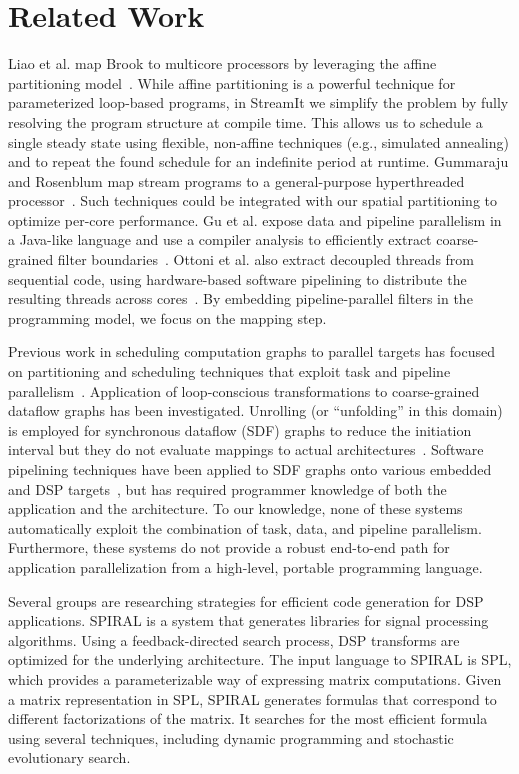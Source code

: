\section{Related Work}


Liao et al. map Brook to multicore processors by leveraging the affine
partitioning model~\cite{liao06brook}.  While affine partitioning is a
powerful technique for parameterized loop-based programs, in StreamIt we
simplify the problem by fully resolving the program structure at
compile time.  This allows us to schedule a single steady state using
flexible, non-affine techniques (e.g., simulated annealing) and to
repeat the found schedule for an indefinite period at runtime.
Gummaraju and Rosenblum map stream programs to a general-purpose
hyperthreaded processor~\cite{gummaraju05micro}.  Such techniques
could be integrated with our spatial partitioning to optimize per-core
performance.  Gu et al. expose data and pipeline parallelism in a
Java-like language and use a compiler analysis to efficiently extract
coarse-grained filter boundaries~\cite{du03sc}.  Ottoni et al. also
extract decoupled threads from sequential code, using hardware-based
software pipelining to distribute the resulting threads across
cores~\cite{ottoni05decoupled}.  By embedding pipeline-parallel
filters in the programming model, we focus on the mapping step.

Previous work in scheduling computation graphs to parallel targets has
focused on partitioning and scheduling techniques that exploit task
and pipeline parallelism~\cite{SDFSched, SDFSched2,may87communicating,
DAGSched, pipeline-sdf}.  Application of loop-conscious
transformations to coarse-grained dataflow graphs has been
investigated.  Unrolling (or ``unfolding'' in this domain) is employed
for synchronous dataflow (SDF) graphs to reduce the initiation
interval but they do not evaluate mappings to actual
architectures~\cite{unfolding,unfolding2}. Software pipelining
techniques have been applied to SDF graphs onto various embedded and
DSP targets~\cite{bakshi99,chatha-02}, but has required programmer
knowledge of both the application and the architecture. To our
knowledge, none of these systems automatically exploit the combination
of task, data, and pipeline parallelism.  Furthermore, these systems
do not provide a robust end-to-end path for application
parallelization from a high-level, portable programming language.


Several groups are researching strategies for efficient code
generation for DSP applications.  SPIRAL is a system that generates
libraries for signal processing
algorithms\cite{spiral,johnson01searching,egner01automatic}.  Using a
feedback-directed search process, DSP transforms are optimized for the
underlying architecture.  The input language to SPIRAL is
SPL\cite{xiong01spl,xiong-thesis}, which provides a parameterizable
way of expressing matrix computations.  Given a matrix representation
in SPL, SPIRAL generates formulas that correspond to different
factorizations of the matrix.  It searches for the most efficient
formula using several techniques, including dynamic programming and
stochastic evolutionary search.

